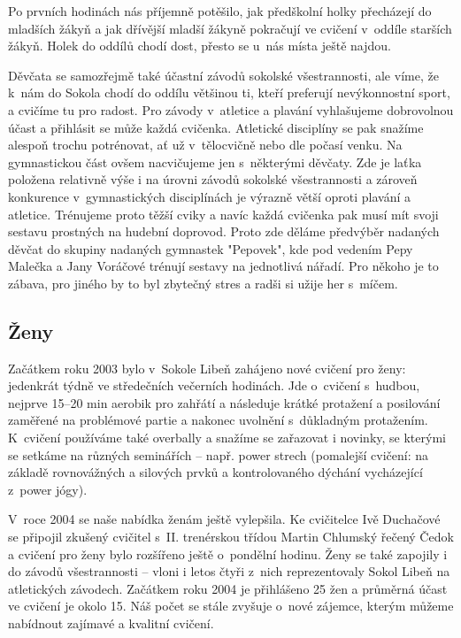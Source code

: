 \documentclass[a5paper, 11pt, twoside]{article}
\begin{document}
Po prvních hodinách nás příjemně potěšilo, jak předškolní holky
přecházejí do mladších žákyň a jak dřívější mladší žákyně pokračují ve
cvičení v~oddíle starších žákyň. Holek do oddílů chodí dost, přesto se
u~nás místa ještě najdou.

Děvčata se samozřejmě také účastní závodů sokolské všestrannosti, ale
víme, že k~nám do Sokola chodí do oddílu většinou ti, kteří preferují
nevýkonnostní sport, a cvičíme tu pro radost. Pro závody v~atletice a
plavání vyhlašujeme dobrovolnou účast a přihlásit se může každá
cvičenka. Atletické disciplíny se pak snažíme alespoň trochu potrénovat,
ať už v~tělocvičně nebo dle počasí venku. Na gymnastickou část ovšem
nacvičujeme jen s~některými děvčaty. Zde je laťka položena relativně
výše i na úrovni závodů sokolské všestrannosti a zároveň konkurence
v~gymnastických disciplínách je výrazně větší oproti plavání a atletice.
Trénujeme proto těžší cviky a navíc každá cvičenka pak musí mít svoji
sestavu prostných na hudební doprovod. Proto zde děláme předvýběr
nadaných děvčat do skupiny nadaných gymnastek "Pepovek", kde pod
vedením Pepy Malečka a Jany Voráčové trénují sestavy na jednotlivá
nářadí. Pro někoho je to zábava, pro jiného by to byl zbytečný stres a
radši si užije her s~míčem.

\subsection{Ženy}

Začátkem roku 2003 bylo v~Sokole Libeň zahájeno nové cvičení pro ženy:
jedenkrát týdně ve středečních večerních hodinách. Jde o~cvičení
s~hudbou, nejprve 15--20 min aerobik pro zahřátí a následuje krátké
protažení a posilování zaměřené na problémové partie a nakonec uvolnění
s~důkladným protažením. K~cvičení používáme také overbally a snažíme se
zařazovat i novinky, se kterými se setkáme na různých seminářích --
např. power strech (pomalejší cvičení: na základě rovnovážných a
silových prvků a kontrolovaného dýchání vycházející z~power jógy).

V~roce 2004 se naše nabídka ženám ještě vylepšila. Ke cvičitelce Ivě
Duchačové se připojil zkušený cvičitel s~II. trenérskou třídou Martin
Chlumský řečený Čedok a cvičení pro ženy bylo rozšířeno ještě o~pondělní
hodinu. Ženy se také zapojily i do závodů všestrannosti -- vloni i letos
čtyři z~nich reprezentovaly Sokol Libeň na atletických závodech.
Začátkem roku 2004 je přihlášeno 25 žen a průměrná účast ve cvičení je
okolo 15. Náš počet se stále zvyšuje o~nové zájemce, kterým můžeme
nabídnout zajímavé a kvalitní cvičení.
\end{document}
